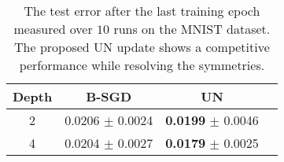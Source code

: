 \documentclass{article} %
\newcommand{\changeBM}[1]{#1} %
\begin{document}
\begin{table*}[t]%
\centering 
\scriptsize{
\begin{tabular}{|c|c|c|c|}
\hline
Depth & B-SGD &  UN \\
\hline
2 &  0.0206 $\pm$ 0.0024 &  \textbf{0.0199} $\pm$ 0.0046 \\
\hline
4 & 0.0204 $\pm$ 0.0027 & \textbf{0.0179} $\pm$ 0.0025 \\
\hline
\end{tabular}}%
\caption{\footnotesize{The test error after the last training epoch measured over $10$ runs on the MNIST dataset. \changeBM{The proposed UN update shows a competitive performance while resolving the symmetries.}} }
\label{TestErr}
\end{table*}


%
%







\end{document}
